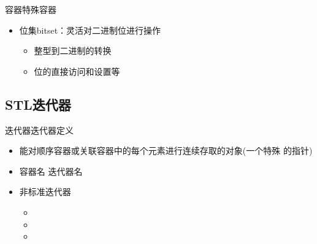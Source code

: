 \begin{frame}[t, fragile]{容器}{特殊容器}%
  \stretchon
  \begin{itemize}
  \item 位集bitset：灵活对二进制位进行操作
    \begin{itemize}
    \item 整型到二进制的转换
    \item 位的直接访问和设置等
    \end{itemize}
  \end{itemize}
  \stretchoff
\end{frame}

\subsection[迭代器]{STL迭代器}\label{sec:chap07-sec03-03}
\begin{frame}[t, fragile]{迭代器}{迭代器定义}%
  \stretchon
  \begin{itemize}
  \item 能对顺序容器或关联容器中的每个元素进行连续存取的对象(一个特殊
    的指针)
  \item 容器名 迭代器名
  \item 非标准迭代器
    \begin{itemize}
    \item {}
    \item {}
    \item {}
    \end{itemize}
  \end{itemize}
  \stretchoff
\end{frame}

